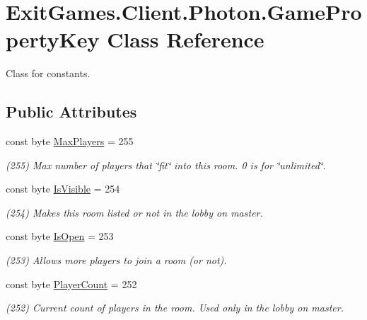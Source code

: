\hypertarget{class_exit_games_1_1_client_1_1_photon_1_1_game_property_key}{}\section{Exit\+Games.\+Client.\+Photon.\+Game\+Property\+Key Class Reference}
\label{class_exit_games_1_1_client_1_1_photon_1_1_game_property_key}


Class for constants.  


\subsection*{Public Attributes}
\begin{DoxyCompactItemize}
\item 
const byte \hyperlink{class_exit_games_1_1_client_1_1_photon_1_1_game_property_key_a824619ef3a7938a5152370fe41e87873}{Max\+Players} = 255
\begin{DoxyCompactList}\small\item\em (255) Max number of players that \char`\"{}fit\char`\"{} into this room. 0 is for \char`\"{}unlimited\char`\"{}.\end{DoxyCompactList}\item 
const byte \hyperlink{class_exit_games_1_1_client_1_1_photon_1_1_game_property_key_a0993168380169958a6371abb880808ed}{Is\+Visible} = 254
\begin{DoxyCompactList}\small\item\em (254) Makes this room listed or not in the lobby on master.\end{DoxyCompactList}\item 
const byte \hyperlink{class_exit_games_1_1_client_1_1_photon_1_1_game_property_key_a1c7589abaef2849dc89cf31aa3a212b5}{Is\+Open} = 253
\begin{DoxyCompactList}\small\item\em (253) Allows more players to join a room (or not).\end{DoxyCompactList}\item 
const byte \hyperlink{class_exit_games_1_1_client_1_1_photon_1_1_game_property_key_a6fdf48ff1a9e010809acc852a416fc7e}{Player\+Count} = 252
\begin{DoxyCompactList}\small\item\em (252) Current count of players in the room. Used only in the lobby on master.\end{DoxyCompactList}\item 

\end{DoxyCompactItemize}
